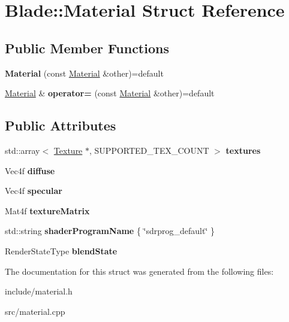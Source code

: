 \hypertarget{struct_blade_1_1_material}{}\section{Blade\+:\+:Material Struct Reference}
\label{struct_blade_1_1_material}
\subsection*{Public Member Functions}
\begin{DoxyCompactItemize}
\item 
\mbox{\label{struct_blade_1_1_material_aa30e4a540910d197976f7fdd55d63be4}} 
{\bfseries Material} (const \hyperlink{struct_blade_1_1_material}{Material} \&other)=default
\item 
\mbox{\label{struct_blade_1_1_material_a8fd3dbd8f60be9a87dba3e2c2bf62375}} 
\hyperlink{struct_blade_1_1_material}{Material} \& {\bfseries operator=} (const \hyperlink{struct_blade_1_1_material}{Material} \&other)=default
\end{DoxyCompactItemize}
\subsection*{Public Attributes}
\begin{DoxyCompactItemize}
\item 
\mbox{\label{struct_blade_1_1_material_ada13e3f833f05decf7f1d315197a6557}} 
std\+::array$<$ \hyperlink{class_blade_1_1_texture}{Texture} $\ast$, S\+U\+P\+P\+O\+R\+T\+E\+D\+\_\+\+T\+E\+X\+\_\+\+C\+O\+U\+NT $>$ {\bfseries textures}
\item 
\mbox{\label{struct_blade_1_1_material_a7355ae3b13d55b8c096741d6776d259e}} 
Vec4f {\bfseries diffuse}
\item 
\mbox{\label{struct_blade_1_1_material_aaaeddb824f6e5e08cf893c4f721033b9}} 
Vec4f {\bfseries specular}
\item 
\mbox{\label{struct_blade_1_1_material_aed0395f4111a3c9925fdcdc73d7f7924}} 
Mat4f {\bfseries texture\+Matrix}
\item 
\mbox{\label{struct_blade_1_1_material_a98b037e6d19c425274f2e3361cffbc69}} 
std\+::string {\bfseries shader\+Program\+Name} \{ \char`\"{}sdrprog\+\_\+default\char`\"{} \}
\item 
\mbox{\label{struct_blade_1_1_material_a71a20a9776b8b5088521279c7b1a20d9}} 
Render\+State\+Type {\bfseries blend\+State}
\end{DoxyCompactItemize}


The documentation for this struct was generated from the following files\+:\begin{DoxyCompactItemize}
\item 
include/material.\+h\item 
src/material.\+cpp\end{DoxyCompactItemize}
